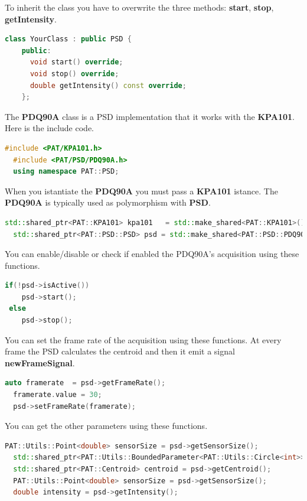 To inherit the class you have to overwrite the three methods:
\textbf{start}, \textbf{stop}, \textbf{getIntensity}.

\begin{lstlisting}[language=c++, gobble=2]
  class YourClass : public PSD {
    public:
      void start() override;
      void stop() override;
      double getIntensity() const override;
    };    
\end{lstlisting}


The \textbf{PDQ90A} class is a PSD implementation that it works with the
\textbf{KPA101}. Here is the include code.

\begin{lstlisting}[language=c++, gobble=2]
  #include <PAT/KPA101.h>
  #include <PAT/PSD/PDQ90A.h>
  using namespace PAT::PSD;  
\end{lstlisting}

When you istantiate the \textbf{PDQ90A} you must pass a \textbf{KPA101}
istance. The \textbf{PDQ90A} is typically used as polymorphism with
\textbf{PSD}.

\begin{lstlisting}[language=c++, gobble=2]
  std::shared_ptr<PAT::KPA101> kpa101   = std::make_shared<PAT::KPA101>();
  std::shared_ptr<PAT::PSD::PSD> psd = std::make_shared<PAT::PSD::PDQ90A>(kpa101);
\end{lstlisting}

You can enable/disable or check if enabled the PDQ90A's acquisition
using these functions.

\begin{lstlisting}[language=c++, gobble=2]
  if(!psd->isActive())
    psd->start();
 else
    psd->stop();
\end{lstlisting}

You can set the frame rate of the acquisition using these functions. At
every frame the PSD calculates the centroid and then it emit a signal
\textbf{newFrameSignal}.

\begin{lstlisting}[language=c++, gobble=2]
  auto framerate  = psd->getFrameRate();
  framerate.value = 30;
  psd->setFrameRate(framerate);
\end{lstlisting}

You can get the other parameters using these functions.

\begin{lstlisting}[language=c++, gobble=2]
  PAT::Utils::Point<double> sensorSize = psd->getSensorSize();
  std::shared_ptr<PAT::Utils::BoundedParameter<PAT::Utils::Circle<int>>> target = psd->getTarget();
  std::shared_ptr<PAT::Centroid> centroid = psd->getCentroid();
  PAT::Utils::Point<double> sensorSize = psd->getSensorSize();
  double intensity = psd->getIntensity();
\end{lstlisting}

